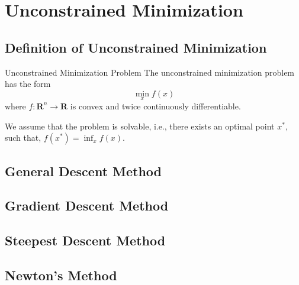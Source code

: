 \chapter{Unconstrained Minimization}

\section{Definition of Unconstrained Minimization}

\begin{definition}{Unconstrained Minimization Problem}{}
    The unconstrained minimization problem has the form
    \begin{equation}
        \min_x f(x)
    \end{equation}
    where $f:\mathbf{R}^n\rightarrow\mathbf{R}$ is convex and twice continuously differentiable. 
\end{definition}

\begin{note}
    We assume that the problem is solvable, i.e., there exists an optimal point $x^*$, such that, $f(x^*)=\inf_x f(x)$.
\end{note}

\begin{example}
    
\end{example}

\begin{example}
    
\end{example}

\begin{example}
    
\end{example}

\begin{example}
    
\end{example}

\section{General Descent Method}

\section{Gradient Descent Method}

\section{Steepest Descent Method}

\section{Newton's Method}